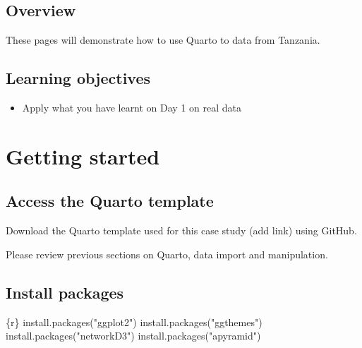 \documentclass[
  letterpaper,
  DIV=11,
  numbers=noendperiod]{scrreprt}
\newenvironment{Shaded}{\begin{snugshade}}{\end{snugshade}}
\newcommand{\FunctionTok}[1]{\textcolor[rgb]{0.28,0.35,0.67}{#1}}
\newcommand{\InformationTok}[1]{\textcolor[rgb]{0.37,0.37,0.37}{#1}}
\newcommand{\NormalTok}[1]{\textcolor[rgb]{0.00,0.23,0.31}{#1}}
\newcommand{\StringTok}[1]{\textcolor[rgb]{0.13,0.47,0.30}{#1}}
\providecommand{\tightlist}{%
  \setlength{\itemsep}{0pt}\setlength{\parskip}{0pt}}\usepackage{longtable,booktabs,array}
\begin{document}
\hypertarget{overview-6}{%
\subsection{Overview}\label{overview-6}}

These pages will demonstrate how to use Quarto to data from Tanzania.

\hypertarget{learning-objectives-7}{%
\subsection{Learning objectives}\label{learning-objectives-7}}

\begin{itemize}
\tightlist
\item
  Apply what you have learnt on Day 1 on real data
\end{itemize}

\hypertarget{getting-started}{%
\section{Getting started}\label{getting-started}}

\hypertarget{access-the-quarto-template}{%
\subsection{Access the Quarto
template}\label{access-the-quarto-template}}

Download the Quarto template used for this case study (add link) using
GitHub.

Please review previous sections on Quarto, data import and manipulation.

\hypertarget{install-packages}{%
\subsection{Install packages}\label{install-packages}}

\begin{Shaded}
\begin{Highlighting}[]
\InformationTok{\textasciigrave{}\textasciigrave{}\textasciigrave{}\{r\}}
\FunctionTok{install.packages}\NormalTok{(}\StringTok{"ggplot2"}\NormalTok{)}
\FunctionTok{install.packages}\NormalTok{(}\StringTok{"ggthemes"}\NormalTok{)}
\FunctionTok{install.packages}\NormalTok{(}\StringTok{"networkD3"}\NormalTok{)}
\FunctionTok{install.packages}\NormalTok{(}\StringTok{"apyramid"}\NormalTok{)}
\InformationTok{\textasciigrave{}\textasciigrave{}\textasciigrave{}}
\end{Highlighting}
\end{Shaded}
\end{document}
